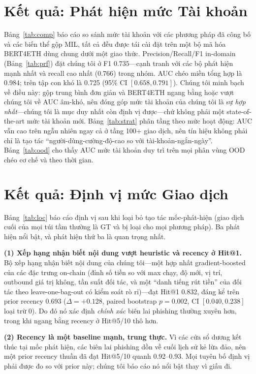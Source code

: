 \documentclass[conference]{IEEEtran}
\begin{document}
\section{Kết quả: Phát hiện mức Tài khoản}
Bảng~\ref{tab:comp} báo cáo so sánh mức tài khoản với các phương pháp đã công bố và
các biến thể gộp MIL, tất cả đều được tái cài đặt trên một bộ mã hóa BERT4ETH dùng
chung dưới một giao thức. Precision/Recall/F1 in-domain (Bảng~\ref{tab:prf}) đặt
chúng tôi ở F1 $0.735$---cạnh tranh với các bộ phát hiện mạnh nhất và recall cao
nhất ($0.766$) trong nhóm. AUC chéo miền tổng hợp là 0.984; trên tập con khó là 0.725
(95\% CI $[0.658,0.791]$). Chúng tôi minh bạch về điều này: gộp trung bình đơn giản
và BERT4ETH ngang bằng hoặc vượt chúng tôi về AUC âm-khó, nên đóng góp mức tài khoản
của chúng tôi là sự \emph{hợp nhất}---chúng tôi là mục duy nhất còn định vị
được---chứ không phải một state-of-the-art mức tài khoản mới. Bảng~\ref{tab:strat}
phân tầng theo mức hoạt động: AUC vẫn cao trên ngẫu nhiên ngay cả ở tầng 100+ giao
dịch, nên tín hiệu không phải chỉ là tạo tác ``người-dùng-cường-độ-cao so với
tài-khoản-ngắn-ngày''. Bảng~\ref{tab:ood} cho thấy AUC mức tài khoản duy trì trên
mọi phân vùng OOD chéo cơ chế và theo thời gian.

\section{Kết quả: Định vị mức Giao dịch}\label{sec:loc}
Bảng~\ref{tab:loc} báo cáo định vị sau khi loại bỏ tạo tác mốc-phát-hiện (giao dịch
cuối của mọi túi tầm thường là GT và bị loại cho mọi phương pháp). Ba phát hiện nổi
bật, và phát hiện thứ ba là quan trọng nhất.

\noindent\textbf{(1) Xếp hạng nhận biết nội dung vượt heuristic và recency ở Hit@1.}
Bộ xếp hạng nhận biết nội dung của chúng tôi---một hợp nhất gradient-boosted của các
đặc trưng on-chain (đỉnh số tiền so với max chạy, độ mới, vị trí, outbound giá trị
không, tần suất đối tác, và một ``danh tiếng rút tiền'' của đối tác theo
leave-one-bag-out có kiểm soát rò rỉ)---đạt Hit@1 0.832, đáng kể trên prior recency
0.693 ($\Delta{=}{+}0.128$, paired bootstrap $p{=}0.002$, CI $[0.040,0.238]$ loại
trừ 0). Do đó nó xác định \emph{chính xác} biên lai phishing thường xuyên hơn, trong
khi ngang bằng recency ở Hit@5/10 thô hơn.

\noindent\textbf{(2) Recency là một baseline mạnh, trung thực.} Vì các cửa sổ dương
kết thúc tại mốc phát hiện, các biên lai phishing dồn về cuối lịch sử kẻ lừa đảo,
nên một prior recency thuần đã đạt Hit@5/10 quanh 0.92--0.93. Mọi tuyên bố định vị
phải được đo so với prior này; chúng tôi báo cáo nó nổi bật thay vì giấu đi.
\end{document}
